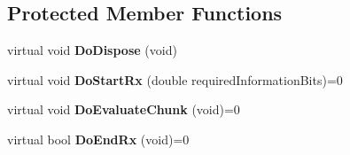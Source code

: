 \subsection*{\-Protected \-Member \-Functions}
\begin{DoxyCompactItemize}
\item 
\hypertarget{classns3_1_1PLC__LinkPerformanceModel_a5051c7e4a3de68b28a7f64afbcc77701}{virtual void {\bfseries \-Do\-Dispose} (void)}\label{classns3_1_1PLC__LinkPerformanceModel_a5051c7e4a3de68b28a7f64afbcc77701}

\item 
\hypertarget{classns3_1_1PLC__LinkPerformanceModel_aa87e7c7b913eb11df941122299f96874}{virtual void {\bfseries \-Do\-Start\-Rx} (double required\-Information\-Bits)=0}\label{classns3_1_1PLC__LinkPerformanceModel_aa87e7c7b913eb11df941122299f96874}

\item 
\hypertarget{classns3_1_1PLC__LinkPerformanceModel_ac0050ee02310a2aa57f746da142cd062}{virtual void {\bfseries \-Do\-Evaluate\-Chunk} (void)=0}\label{classns3_1_1PLC__LinkPerformanceModel_ac0050ee02310a2aa57f746da142cd062}

\item 
\hypertarget{classns3_1_1PLC__LinkPerformanceModel_a7a5e8e08ad2f4dcd57a3a4aa48f1ddd5}{virtual bool {\bfseries \-Do\-End\-Rx} (void)=0}\label{classns3_1_1PLC__LinkPerformanceModel_a7a5e8e08ad2f4dcd57a3a4aa48f1ddd5}

\end{DoxyCompactItemize}

